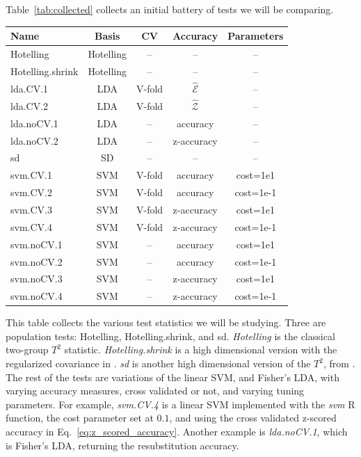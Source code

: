 \documentclass[12pt,a4paper]{article}
\theoremstyle{definition}
\newcommand{\accEstim}{\hat{\mathcal{E}}}
\newcommand{\accZ}{\hat{\mathcal{Z}}}
\newcommand{\R}{\textsf{R }}
\begin{document}
Table~\ref{tab:collected} collects an initial battery of tests we will be comparing. 
\begin{tcolorbox}
\centering
\begin{tabular}{l|c|c|c|c}
Name & Basis & CV & Accuracy & Parameters\\ 
\hline
\hline
Hotelling & Hotelling & -- & -- & -- \\ 
Hotelling.shrink & Hotelling & -- & -- & -- \\ 
lda.CV.1 & LDA & V-fold & $\accEstim$ &  -- \\ 
lda.CV.2 & LDA & V-fold & $\accZ$ & -- \\ 
lda.noCV.1 & LDA & -- & accuracy &  --\\ 
lda.noCV.2 & LDA & -- & z-accuracy &  --\\ 
sd & SD & -- & -- & -- \\ 
svm.CV.1 & SVM & V-fold & accuracy & cost=1e1 \\ 
svm.CV.2 & SVM & V-fold & accuracy & cost=1e-1 \\ 
svm.CV.3 & SVM & V-fold & z-accuracy & cost=1e1 \\ 
svm.CV.4 & SVM & V-fold & z-accuracy & cost=1e-1 \\ 
svm.noCV.1 & SVM & -- & accuracy & cost=1e1 \\ 
svm.noCV.2 & SVM & -- & accuracy & cost=1e-1 \\ 
svm.noCV.3 & SVM & -- & z-accuracy & cost=1e1 \\ 
svm.noCV.4 & SVM & -- & z-accuracy & cost=1e-1 \\
\end{tabular} 
\captionsetup{type=table}
\caption{\footnotesize
This table collects the various test statistics we will be studying. 
Three are population tests: Hotelling, Hotelling.shrink, and sd.
\textit{Hotelling} is the classical two-group $T^2$ statistic. 
\textit{Hotelling.shrink} is a high dimensional version with the regularized covariance in \cite{schafer_shrinkage_2005}. 
\textit{sd} is another high dimensional version of the $T^2$, from \cite{srivastava_two_2013}. 
The rest of the tests are variations of the linear SVM, and Fisher's LDA, with varying accuracy measures, cross validated or not, and varying tuning parameters. 
For example, \textit{svm.CV.4} is a linear SVM implemented with the \emph{svm} \R function,
the cost parameter set at $0.1$, and using the cross validated z-scored accuracy in Eq.~\ref{eq:z_scored_accuracy}.
Another example is \textit{lda.noCV.1}, which is Fisher's LDA, returning the resubstitution accuracy.}
\label{tab:collected}
\end{tcolorbox}
\end{document}
